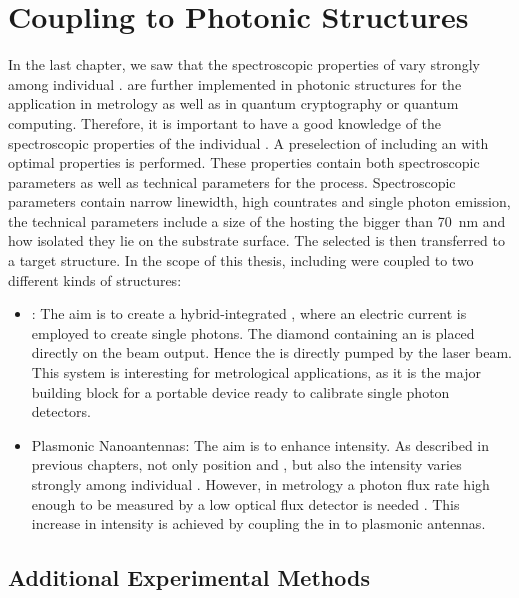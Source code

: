 
\chapter[Coupling NDs]{Coupling \Nds to Photonic Structures}	\label{ch::coupling}

	In the last chapter, we saw that the spectroscopic properties of \sivs vary strongly among individual \nds.
	\Nds are further implemented in photonic structures for the application in metrology as well as in quantum cryptography or quantum computing.
	Therefore, it is important to have a good knowledge of the spectroscopic properties of the individual  \siv.
	A preselection of \nds including an \siv with optimal properties is performed.
	These properties contain both spectroscopic parameters as well as technical parameters for the \pp process.
	Spectroscopic parameters contain narrow linewidth, high countrates and single photon emission, the technical parameters include a size of the \nds hosting the \siv bigger than \SI{70}{nm} and how isolated they lie on the substrate surface.
	The selected \nd is then transferred to a target structure.
	In the scope of this thesis, \nds including \sivs were coupled to two different kinds of structures:
	\begin{itemize}
		\item \Vcsels: The aim is to create a hybrid-integrated \sps, where an electric current is employed to create single photons. The diamond containing an \siv is placed directly on the beam output. Hence the \siv is directly pumped by the laser beam. This system is interesting for metrological applications, as it is the major building block for a portable device ready to calibrate single photon detectors.
		\item Plasmonic Nanoantennas: The aim is to enhance \pl intensity. As described in previous chapters, not only \ZPL position and \lw, but also the \pl intensity varies strongly among individual \sivs. However, in metrology a photon flux rate high enough to be measured by a low optical flux detector is needed \cite{Vaigu2017}. This increase in intensity is achieved by coupling the \sivs in \nds to plasmonic antennas.
	\end{itemize}


	\section{Additional Experimental Methods} \label{sec::methods_coupling}


